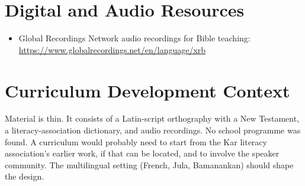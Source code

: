 \documentclass[12pt]{article}
\begin{document}
\section{Digital and Audio Resources}
\begin{itemize}
\item Global Recordings Network audio recordings for Bible teaching: \url{https://www.globalrecordings.net/en/language/xrb}
\end{itemize}

\section{Curriculum Development Context}
Material is thin. It consists of a Latin-script orthography with a New Testament, a literacy-association dictionary, and audio recordings. No school programme was found. A curriculum would probably need to start from the Kar literacy association's earlier work, if that can be located, and to involve the speaker community. The multilingual setting (French, Jula, Bamanankan) should shape the design.
\end{document}
